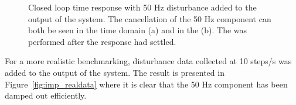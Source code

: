 \begin{figure}[h!]
  \centering %
  \qquad
  \caption{\label{fig:rfdc_p_atten} Closed loop time response with 50 Hz disturbance added to the output of the system. The cancellation of the 50 Hz component can both be seen in the time domain (a) and in the \abbrFFT (b). The \abbrFFT was performed after the response had settled.}
\end{figure}

For a more realistic benchmarking, disturbance data collected at 10 steps/s was added to the output of the system. The result is presented in Figure~\ref{fig:imp_realdata} where it is clear that the 50 Hz component has been damped out efficiently.

